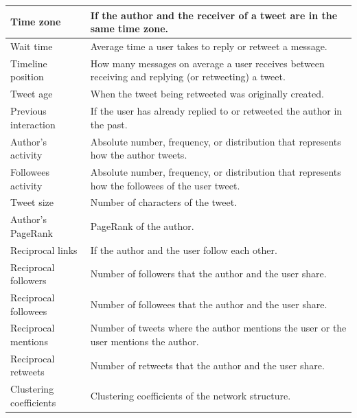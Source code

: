 \begin{table}[htbp]
\begin{tabular}{|>{\raggedright\centering\arraybackslash}m{4cm}|m{11cm}|}
		Time zone 																					& If the author and the receiver of a tweet are in the same time zone. \cite{Luo2013} \\ \hline
		Wait time 																					& Average time a user takes to reply or retweet a message. \cite{Comarela2012,Hong2011} \\ \hline
		Timeline position 													& How many messages on average a user receives between receiving and replying (or retweeting) a tweet. \cite{Comarela2012} \\ \hline
		Tweet age 																					& When the tweet being retweeted was originally created. \cite{Comarela2012,Hong2011} \\ \hline
		Previous interaction 																& If the user has already replied to or retweeted the author in the past. \cite{Comarela2012,Luo2013,Wang2012} \\ \hline
		Author's activity 																	& Absolute number, frequency, or distribution that represents how the author tweets. \cite{Comarela2012,Hong2011,Liu2013,Luo2013,Peng2011,Petrovic2011,Suh2010,Wang2012} \\ \hline
		Followees activity 																	& Absolute number, frequency, or distribution that represents how the followees of the user tweet. \cite{Peng2011} \\ \hline
		Tweet size 																					& Number of characters of the tweet. \cite{Comarela2012,Petrovic2011} \\ \hline
		Author's PageRank 																	& PageRank of the author. \cite{Hong2011,Wang2012} \\ \hline
		Reciprocal links 
																		& If the author and the user follow each other. \cite{Hong2011,Peng2011,Wang2012} \\ \hline
		Reciprocal followers 																& Number of followers that the author and the user share. \cite{Peng2011,Wang2012} \\ \hline
		Reciprocal followees 																& Number of followees that the author and the user share. \cite{Peng2011,Wang2012} \\ \hline
		Reciprocal mentions 																& Number of tweets where the author mentions the user or the user mentions the author. \cite{Peng2011} \\ \hline
		Reciprocal retweets 																& Number of retweets that the author and the user share. \cite{Peng2011} \\ \hline
		Clustering coefficients 															& Clustering coefficients of the network structure. \cite{Hong2011} \\ \hline

\end{tabular}
\end{table}
